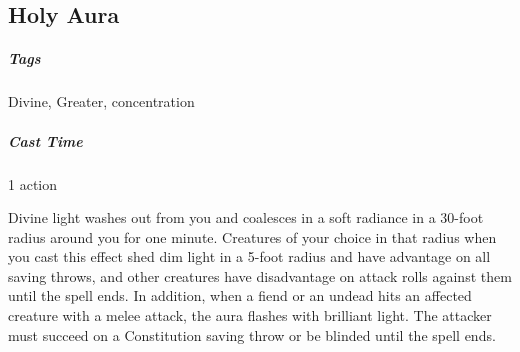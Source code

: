 \subsection{Holy Aura}
\subparagraph*{Tags} Divine, Greater, concentration
\subparagraph*{Cast Time} 1 action

Divine light washes out from you and coalesces in a soft radiance in a 30-foot radius around you for one minute. Creatures of your choice in that radius when you cast this effect shed dim light in a 5-foot radius and have advantage on all saving throws, and other creatures have disadvantage on attack rolls against them until the spell ends. In addition, when a fiend or an undead hits an affected creature with a melee attack, the aura flashes with brilliant light. The attacker must succeed on a Constitution saving throw or be blinded until the spell ends.











